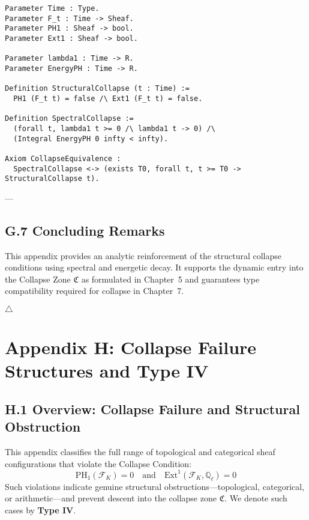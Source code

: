 \documentclass[11pt]{article}
\begin{document}
\begin{lstlisting}[language=Coq, caption={Coq: Spectral $\Longleftrightarrow$ Structural Collapse}]
Parameter Time : Type.
Parameter F_t : Time -> Sheaf.
Parameter PH1 : Sheaf -> bool.
Parameter Ext1 : Sheaf -> bool.

Parameter lambda1 : Time -> R.
Parameter EnergyPH : Time -> R.

Definition StructuralCollapse (t : Time) :=
  PH1 (F_t t) = false /\ Ext1 (F_t t) = false.

Definition SpectralCollapse :=
  (forall t, lambda1 t >= 0 /\ lambda1 t -> 0) /\
  (Integral EnergyPH 0 infty < infty).

Axiom CollapseEquivalence :
  SpectralCollapse <-> (exists T0, forall t, t >= T0 -> StructuralCollapse t).
\end{lstlisting}

---

\subsection*{G.7 Concluding Remarks}

This appendix provides an analytic reinforcement of the structural collapse conditions using spectral and energetic decay.  
It supports the dynamic entry into the Collapse Zone \( \mathfrak{C} \) as formulated in Chapter~5 and guarantees type compatibility required for collapse in Chapter~7.

\hfill $\triangle$



\section*{Appendix H: Collapse Failure Structures and Type IV}

\subsection*{H.1 Overview: Collapse Failure and Structural Obstruction}

This appendix classifies the full range of topological and categorical sheaf configurations that violate the Collapse Condition:
\[
\mathrm{PH}_1(\mathcal{F}_K) = 0 \quad \text{and} \quad \mathrm{Ext}^1(\mathcal{F}_K, \mathbb{Q}_\ell) = 0
\]
Such violations indicate genuine structural obstructions—topological, categorical, or arithmetic—and prevent descent into the collapse zone \( \mathfrak{C} \).  
We denote such cases by \textbf{Type IV}.
\end{document}

